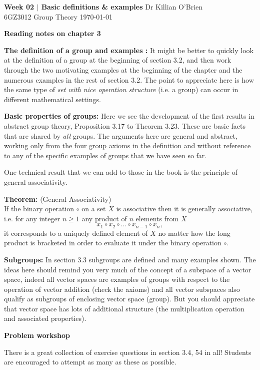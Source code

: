 \documentclass[oneside,10pt]{amsart}
\newcommand{\cbox}[1]{\begin{tcolorbox}[left=0.5mm,right=0.5mm,top=0.5mm,bottom=0.5mm, boxsep=2pt, boxrule=0pt,colback=black]\color{white}\sffamily #1 \end{tcolorbox}}
\newcommand{\tuttitle}[4]{\cbox{\textbf{#1} \hfill {#2}\\{#3} \hfill {\Small #4}}\vskip 4pt}
\newcommand{\topic}[1]{\cbox{\textbf{#1}}\vskip 4pt}
\begin{document}
\tuttitle{Week 02 $|$ Basic definitions \& examples}{Dr Killian O'Brien}{6GZ3012 Group Theory}{\today}

\topic{Reading notes on chapter 3}

\textbf{The definition of a group and examples :}
It might be better to quickly look at the definition of a group at the beginning of section 3.2, and then work through the two motivating examples at the beginning of the chapter and the numerous examples in the rest of section 3.2. The point to appreciate here is how the same type of \emph{set with nice operation structure} (i.e. a group) can occur in different mathematical settings.

\textbf{Basic properties of groups:} Here we see the development of the first results in abstract group theory, Proposition 3.17 to Theorem 3.23. These are basic facts that are shared by \emph{all} groups. The arguments here are general and abstract, working only from the four group axioms in the definition and without reference to any of the specific examples of groups that we have seen so far.

One technical result that we can add to those in the book is the principle of general associativity.

\begin{tcolorbox}[colback=black!15]
\textbf{Theorem:} (General Associativity)\\
If the binary operation $\circ$ on a set $X$ is associative then it is generally associative, i.e. for any integer $n \geq 1$ any product of $n$ elements from $X$
$$ x_1 \circ x_2 \circ \dots \circ x_{n-1} \circ x_n,$$
it corresponds to a uniquely defined element of $X$ no matter how the long product is bracketed in order to evaluate it under the binary operation $\circ$.
\end{tcolorbox}

\textbf{Subgroups:}
In section 3.3 subgroups are defined and many examples shown. The ideas here should remind you very much of the concept of a subspace of a vector space, indeed all vector spaces are examples of groups with respect to the operation of vector addition (check the axioms) and all vector subspaces also qualify as subgroups of enclosing vector space (group). But you should appreciate that vector space has lots of additional structure (the multiplication operation and associated properties).

\topic{Problem workshop}
There is a great collection of exercise questions in section 3.4, 54 in all! Students are encouraged to attempt as many as these as possible.
\end{document}
